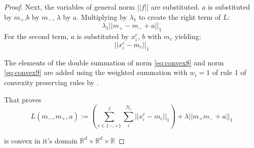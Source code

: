 \begin{proof}
Next, the variables of general norm $||f||$ are substituted. $a$ is substituted by $m_+$,$b$ by $m_-$, $\lambda$ by $a$. Multiplying by $\lambda_1$ to create the right term of $L$:
\begin{equation}
    \lambda_1||m_+-m_-+a||_1
    \label{eq:convex7}
\end{equation}
For the second term, $a$ is substituted by $x_i^c$, $b$ with $m_c$ yielding:
\begin{equation}
    ||x_i^c-m_c||_1 
    \label{eq:convex8}
\end{equation}

The elements of the double summation of norm \cref{eq:convex8} and norm \cref{eq:convex9} are added using the weighted summation with $w_i=1$ of rule 1 of convexity preserving rules by \cite{preserving_convexity_rules_berkely}.

That proves
\begin{equation}
    L(m_-,m_+,a):=\left(\sum_{c \in \{-,+\}}^j \sum_{i}^{N_c}||x_i^c-m_c||_1 \right)+\lambda ||m_+m_-+a||_1
    \label{eq:objective_function}
\end{equation}

is convex in it's domain $\mathbb{R}^d\times \mathbb{R}^d \times \mathbb{R}$
\end{proof}